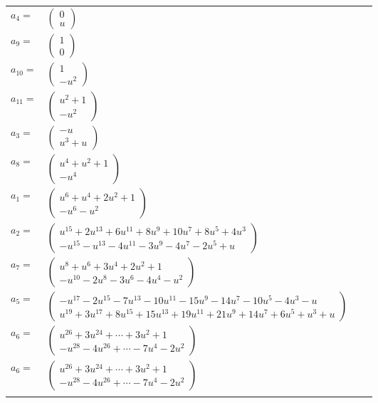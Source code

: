 \documentclass[1p]{elsarticle_modified}
\theoremstyle{definition}
\begin{document}
\begin{tabular}{m{7pt} m{180pt} m{7pt} m{180pt} }
\flushright $a_{4}=$&$\begin{pmatrix}0\\u\end{pmatrix}$ \\
\flushright $a_{9}=$&$\begin{pmatrix}1\\0\end{pmatrix}$ \\
\flushright $a_{10}=$&$\begin{pmatrix}1\\- u^2\end{pmatrix}$ \\
\flushright $a_{11}=$&$\begin{pmatrix}u^2+1\\- u^2\end{pmatrix}$ \\
\flushright $a_{3}=$&$\begin{pmatrix}- u\\u^3+u\end{pmatrix}$ \\
\flushright $a_{8}=$&$\begin{pmatrix}u^4+u^2+1\\- u^4\end{pmatrix}$ \\
\flushright $a_{1}=$&$\begin{pmatrix}u^6+u^4+2 u^2+1\\- u^6- u^2\end{pmatrix}$ \\
\flushright $a_{2}=$&$\begin{pmatrix}u^{15}+2 u^{13}+6 u^{11}+8 u^9+10 u^7+8 u^5+4 u^3\\- u^{15}- u^{13}-4 u^{11}-3 u^9-4 u^7-2 u^5+u\end{pmatrix}$ \\
\flushright $a_{7}=$&$\begin{pmatrix}u^8+u^6+3 u^4+2 u^2+1\\- u^{10}-2 u^8-3 u^6-4 u^4- u^2\end{pmatrix}$ \\
\flushright $a_{5}=$&$\begin{pmatrix}- u^{17}-2 u^{15}-7 u^{13}-10 u^{11}-15 u^9-14 u^7-10 u^5-4 u^3- u\\u^{19}+3 u^{17}+8 u^{15}+15 u^{13}+19 u^{11}+21 u^9+14 u^7+6 u^5+u^3+u\end{pmatrix}$ \\
\flushright $a_{6}=$&$\begin{pmatrix}u^{26}+3 u^{24}+\cdots+3 u^2+1\\- u^{28}-4 u^{26}+\cdots-7 u^4-2 u^2\end{pmatrix}$\\ \flushright $a_{6}=$&$\begin{pmatrix}u^{26}+3 u^{24}+\cdots+3 u^2+1\\- u^{28}-4 u^{26}+\cdots-7 u^4-2 u^2\end{pmatrix}$\\&\end{tabular}
\end{document}
